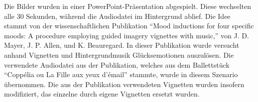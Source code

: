 Die Bilder wurden in einer PowerPoint-Pr{\"a}sentation abgespielt. 
Diese wechselten alle 30 Sekunden, w{\"a}hrend die Audiodatei im Hintergrund ablief.
Die Idee stammt von der wissenschaftlichen Publikation ``Mood inductions for four specific moods: A procedure employing guided imagery vignettes with music,'' von J. D. Mayer, J. P. Allen, und K. Beauregard. 
In dieser Publikation wurde versucht anhand Vignetten und Hintergrundmusik Gl{\"u}cksemotionen auszul{\"o}sen.
Die verwendete Audiodatei aus der Publikation, welches aus dem Ballettst{\"u}ck ``Coppélia ou La Fille aux yeux d'émail'' stammte, wurde in diesem Szenario {\"u}bernommen. 
Die aus der Publikation verwendeten Vignetten wurden insofern modifiziert, das einzelne durch eigene Vignetten ersetzt wurden.

